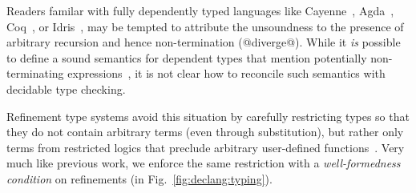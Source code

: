 



 Readers familar 
with fully dependently typed languages like 
Cayenne~\cite{cayenne}, Agda~\cite{norell07}, 
Coq~\cite{coq-book}, or Idris~\cite{Brady13}, may be
tempted to attribute the unsoundness to the presence 
of arbitrary recursion and hence non-termination 
(\eg @diverge@).
While it \emph{is} possible to define a sound semantics 
for dependent types that mention potentially non-terminating
expressions~\citep{Knowles10}, it is not clear how to reconcile
such semantics with decidable type checking. 

Refinement type systems avoid this situation by carefully restricting 
types so that they do not contain arbitrary terms (even through 
substitution), but rather only terms from restricted logics that
preclude arbitrary user-defined functions~\cite{pfenningxi98,Dunfield07,fstar}.
Very much like previous work, we enforce the same restriction
with a \emph{well-formedness condition} on 
refinements (\rwbased in Fig.~\ref{fig:declang:typing}).

